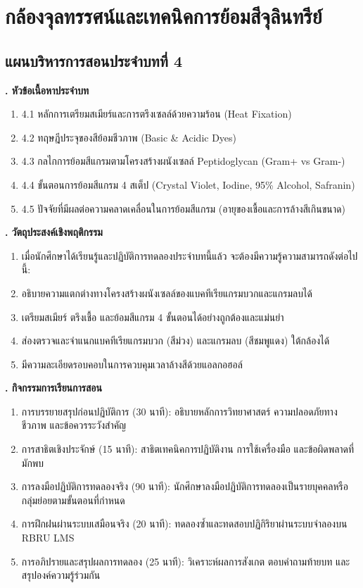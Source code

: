 \chapter{กล้องจุลทรรศน์และเทคนิคการย้อมสีจุลินทรีย์}
\label{chap:ch04}

\section*{แผนบริหารการสอนประจำบทที่ 4}

\noindent\textbf{. หัวข้อเนื้อหาประจำบท}

\begin{enumerate}
    \item 4.1 หลักการเตรียมสเมียร์และการตรึงเซลล์ด้วยความร้อน (Heat Fixation)
    \item 4.2 ทฤษฎีประจุของสีย้อมชีวภาพ (Basic \& Acidic Dyes)
    \item 4.3 กลไกการย้อมสีแกรมตามโครงสร้างผนังเซลล์ Peptidoglycan (Gram+ vs Gram-)
    \item 4.4 ขั้นตอนการย้อมสีแกรม 4 สเต็ป (Crystal Violet, Iodine, 95\% Alcohol, Safranin)
    \item 4.5 ปัจจัยที่มีผลต่อความคลาดเคลื่อนในการย้อมสีแกรม (อายุของเชื้อและการล้างสีเกินขนาด)
\end{enumerate}

\noindent\textbf{. วัตถุประสงค์เชิงพฤติกรรม}

\begin{enumerate}
    \item เมื่อนักศึกษาได้เรียนรู้และปฏิบัติการทดลองประจำบทนี้แล้ว จะต้องมีความรู้ความสามารถดังต่อไปนี้:
    \item อธิบายความแตกต่างทางโครงสร้างผนังเซลล์ของแบคทีเรียแกรมบวกและแกรมลบได้
    \item เตรียมสเมียร์ ตรึงเชื้อ และย้อมสีแกรม 4 ขั้นตอนได้อย่างถูกต้องและแม่นยำ
    \item ส่องตรวจและจำแนกแบคทีเรียแกรมบวก (สีม่วง) และแกรมลบ (สีชมพูแดง) ใต้กล้องได้
    \item มีความละเอียดรอบคอบในการควบคุมเวลาล้างสีด้วยแอลกอฮอล์
\end{enumerate}

\noindent\textbf{. กิจกรรมการเรียนการสอน}

\begin{enumerate}
    \item การบรรยายสรุปก่อนปฏิบัติการ (30 นาที): อธิบายหลักการวิทยาศาสตร์ ความปลอดภัยทางชีวภาพ และข้อควรระวังสำคัญ
    \item การสาธิตเชิงประจักษ์ (15 นาที): สาธิตเทคนิคการปฏิบัติงาน การใช้เครื่องมือ และข้อผิดพลาดที่มักพบ
    \item การลงมือปฏิบัติการทดลองจริง (90 นาที): นักศึกษาลงมือปฏิบัติการทดลองเป็นรายบุคคลหรือกลุ่มย่อยตามขั้นตอนที่กำหนด
    \item การฝึกฝนผ่านระบบเสมือนจริง (20 นาที): ทดลองซ้ำและทดสอบปฏิกิริยาผ่านระบบจำลองบน RBRU LMS
    \item การอภิปรายและสรุปผลการทดลอง (25 นาที): วิเคราะห์ผลการสังเกต ตอบคำถามท้ายบท และสรุปองค์ความรู้ร่วมกัน
\end{enumerate}

